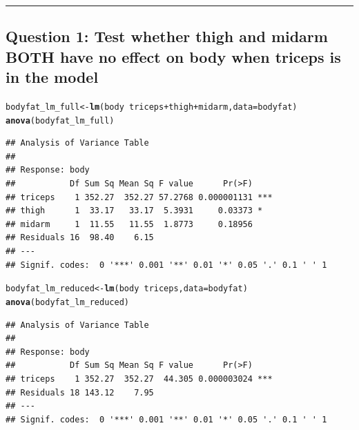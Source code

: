 \documentclass{article}\usepackage[]{graphicx}\usepackage[]{color}
\makeatletter
\newcommand{\hlopt}[1]{\textcolor[rgb]{0,0,0}{#1}}%
\newcommand{\hlstd}[1]{\textcolor[rgb]{0.345,0.345,0.345}{#1}}%
\newcommand{\hlkwb}[1]{\textcolor[rgb]{0.69,0.353,0.396}{#1}}%
\newcommand{\hlkwc}[1]{\textcolor[rgb]{0.333,0.667,0.333}{#1}}%
\newcommand{\hlkwd}[1]{\textcolor[rgb]{0.737,0.353,0.396}{\textbf{#1}}}%
\newenvironment{kframe}{%
 \def\at@end@of@kframe{}%
 \ifinner\ifhmode%
  \def\at@end@of@kframe{\end{minipage}}%
  \begin{minipage}{\columnwidth}%
 \fi\fi%
 \def\FrameCommand##1{\hskip\@totalleftmargin \hskip-\fboxsep
 \colorbox{shadecolor}{##1}\hskip-\fboxsep
     \hskip-\linewidth \hskip-\@totalleftmargin \hskip\columnwidth}%
 \MakeFramed {\advance\hsize-\width
   \@totalleftmargin\z@ \linewidth\hsize
   \@setminipage}}%
 {\par\unskip\endMakeFramed%
 \at@end@of@kframe}
\newenvironment{knitrout}{}{} %
\makeatother
\begin{document}
\medskip
\hrule
\medskip

\subsection*{Question 1: Test whether thigh and midarm BOTH have no effect on body when triceps is in the model}

\begin{knitrout}
\color{fgcolor}\begin{kframe}
\begin{alltt}
\hlstd{bodyfat_lm_full} \hlkwb{<-} \hlkwd{lm}\hlstd{(body} \hlopt{~} \hlstd{triceps} \hlopt{+} \hlstd{thigh} \hlopt{+} \hlstd{midarm,} \hlkwc{data} \hlstd{= bodyfat)}
\hlkwd{anova}\hlstd{(bodyfat_lm_full)}
\end{alltt}
\begin{verbatim}
## Analysis of Variance Table
## 
## Response: body
##           Df Sum Sq Mean Sq F value      Pr(>F)    
## triceps    1 352.27  352.27 57.2768 0.000001131 ***
## thigh      1  33.17   33.17  5.3931     0.03373 *  
## midarm     1  11.55   11.55  1.8773     0.18956    
## Residuals 16  98.40    6.15                        
## ---
## Signif. codes:  0 '***' 0.001 '**' 0.01 '*' 0.05 '.' 0.1 ' ' 1
\end{verbatim}
\begin{alltt}
\hlstd{bodyfat_lm_reduced} \hlkwb{<-} \hlkwd{lm}\hlstd{(body} \hlopt{~} \hlstd{triceps,} \hlkwc{data} \hlstd{= bodyfat)}
\hlkwd{anova}\hlstd{(bodyfat_lm_reduced)}
\end{alltt}
\begin{verbatim}
## Analysis of Variance Table
## 
## Response: body
##           Df Sum Sq Mean Sq F value      Pr(>F)    
## triceps    1 352.27  352.27  44.305 0.000003024 ***
## Residuals 18 143.12    7.95                        
## ---
## Signif. codes:  0 '***' 0.001 '**' 0.01 '*' 0.05 '.' 0.1 ' ' 1
\end{verbatim}
\end{kframe}
\end{knitrout}
\end{document}
